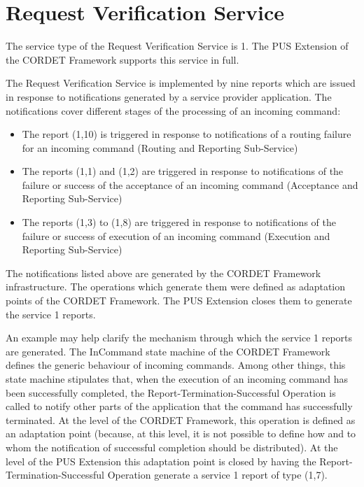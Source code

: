 \documentclass{pnp_article}
\begin{document}
\section{Request Verification Service}\label{sec:serv1}
The service type of the Request Verification Service is 1. The PUS Extension of the CORDET Framework supports this service in full.

The Request Verification Service is implemented by nine reports which are issued  in response to notifications generated by a service provider application. The notifications cover different stages of the processing of an incoming command:

\begin{itemize}
\item The report (1,10) is triggered in response to notifications of a routing failure for an incoming command (Routing and Reporting Sub-Service)
\item The reports (1,1) and (1,2) are triggered in response to notifications of the failure or success of the acceptance of an incoming command (Acceptance and Reporting Sub-Service) 
\item The reports (1,3) to (1,8) are triggered in response to notifications of the failure or success of execution of an incoming command (Execution and Reporting Sub-Service)
\end{itemize}

The notifications listed above are generated by the CORDET Framework infrastructure. The operations which generate them were defined as adaptation points of the CORDET Framework. The PUS Extension closes them to generate the service 1 reports. 

An example may help clarify the mechanism through which the service 1 reports are generated. The InCommand state machine of the CORDET Framework defines the generic behaviour of incoming commands. Among other things, this state machine stipulates that, when the execution of an incoming command has been successfully completed, the Report-Termination-Successful Operation is called to notify other parts of the application that the command has successfully terminated. At the level of the CORDET Framework, this operation is defined as an adaptation point (because, at this level, it is not possible to define how and to whom the notification of successful completion should be distributed). At the level of the PUS Extension this adaptation point is closed by having the Report-Termination-Successful Operation generate a service 1 report of type (1,7).
\end{document}
